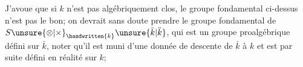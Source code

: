 J'avoue que si $k$ n'est pas algébriquement clos, le groupe fondamental ci-dessus n'est   pas le bon; on devrait sans doute prendre le groupe fondamental de $S\unsure{\otimes|\times}_{\handwritten{k}}\unsure{\bar{k}|\ddot{k}}$, qui est un groupe proalgébrique défini sur $\bar{k}$, noter qu'il est muni d'une donnée de descente de $\bar{k}$ à $k$ et est par suite défini en réalité sur $k$; 
